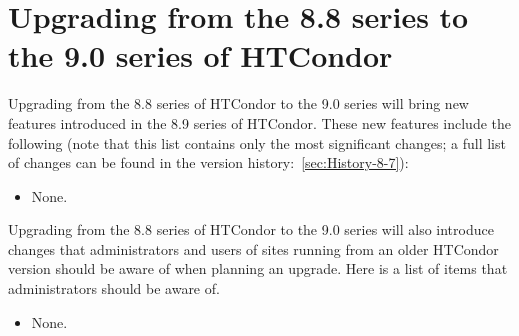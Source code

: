 \section{Upgrading from the 8.8 series to the 9.0 series of HTCondor}\label{sec:to-9.0}

Upgrading from the 8.8 series of HTCondor to the 9.0 series
will bring new features introduced in the 8.9 series of HTCondor.
These new features include the following (note that this list contains
only the most significant changes; a full list of changes can be
found in the version history:~\ref{sec:History-8-7}):

\begin{itemize}

\item None.

\end{itemize}

Upgrading from the 8.8 series of HTCondor to the 9.0 series will
also introduce changes that administrators and users of sites running
from an older HTCondor version should be aware of when planning an upgrade.
Here is a list of items that administrators should be aware of.

\begin{itemize}

\item None.

\end{itemize}

